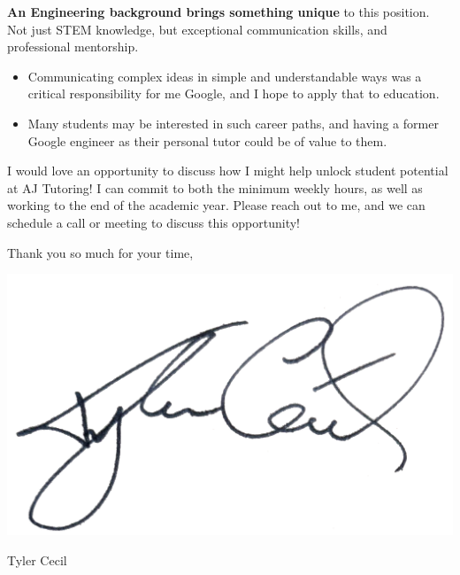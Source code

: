 \documentclass[sans, a4paper, 12pt]{article}
\newcommand{\cvcolor}[1]{{\color{MidnightBlue}#1}}
\renewcommand{\hl}[1]{\cvcolor{\textbf{#1}}}
\begin{document}
\begin{adjustwidth}{40pt}{40pt}
  \hl{An Engineering background brings something unique} to this position. Not
  just STEM knowledge, but exceptional communication skills, and professional
  mentorship.\smallskip

  \begin{itemize}
    \item Communicating complex ideas in simple and understandable ways was a
      critical responsibility for me Google, and I hope to apply that to
      education.
    \item Many students may be interested in such career paths, and having a
      former Google engineer as their personal tutor could be of value to them.
  \end{itemize}
  \medskip

  I would love an opportunity to discuss how I might help unlock student
  potential at AJ Tutoring! I can commit to both the minimum weekly hours, as
  well as working to the end of the academic year. Please reach out to me, and
  we can schedule a call or meeting to discuss this opportunity!
  \bigskip

  \begin{minipage}{0.5\linewidth}
    Thank you so much for your time,
  \end{minipage}
  \begin{minipage}{0.5\linewidth}
    \vspace{-1.5em}
    \hfill\includegraphics[height=4.5\baselineskip]{sig}

    \vspace{-2em}
    \hfill Tyler Cecil
  \end{minipage}



\end{adjustwidth}
\end{document}
